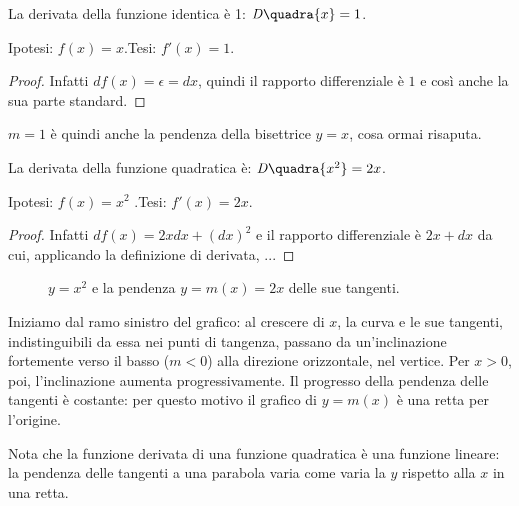 \begin{teorema}
  La derivata della funzione identica è 1: $\mathit{D}\quadra{x}=1$.
\end{teorema}
\noindent Ipotesi: $f(x)=x$.\tab Tesi: $f'(x)=1$.
\begin{proof}
 Infatti $df(x)=\epsilon=dx$, quindi il rapporto differenziale è $1$ e così
 anche la sua parte standard.
\end{proof}
\begin{osservazione}
 $m=1$ è quindi anche la pendenza della bisettrice $y=x$, cosa ormai risaputa.
\end{osservazione}

\begin{teorema}
  La derivata della funzione quadratica è: $\mathit{D}\quadra{x^2}=2x$.
\end{teorema}
\noindent Ipotesi: $f(x)=x^2$ .\tab Tesi: $f'(x)=2x$.
\begin{proof}
  Infatti $df(x)=2xdx+(dx)^2$ e il rapporto differenziale è $2x+dx$ da cui,
  applicando la definizione di derivata, ...
\end{proof}

\begin{figure}[h!]
\begin{inaccessibleblock}
 \begin{center}
 \begin{minipage}[]{.48\textwidth}
 \parabola
 \end{minipage} 
 \hfill
 \begin{minipage}[]{.48\textwidth}
  \tangentiparabola
 \end{minipage}
 \end{center}
\end{inaccessibleblock}
\caption{$y=x^2$ e la pendenza $y=m(x)=2x$ delle sue tangenti.} 
\label{}
\end{figure}

Iniziamo dal ramo sinistro del grafico: al crescere di $x$, la curva e le 
sue 
tangenti, indistinguibili da essa nei punti di tangenza, passano
da un'inclinazione fortemente verso il basso ($m<0$) alla direzione 
orizzontale,
nel vertice. Per $x>0$, poi, l'inclinazione aumenta progressivamente. Il 
progresso della pendenza delle tangenti è costante: per questo motivo il 
grafico di $y=m(x)$ è una retta per l'origine.

\begin{osservazione}
Nota che la funzione derivata di una funzione quadratica è una funzione 
lineare: la pendenza delle tangenti a una parabola varia come varia la $y$
rispetto alla $x$ in una retta.
\end{osservazione}

